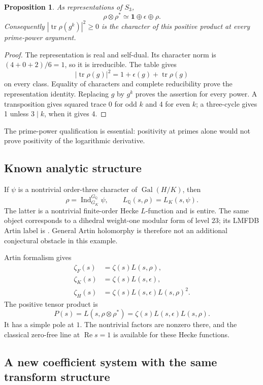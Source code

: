 \documentclass[11pt,letterpaper]{article}
\newtheorem{proposition}[theorem]{Proposition}
\theoremstyle{definition}
\theoremstyle{remark}
\newcommand{\Q}{\mathbb Q}
\newcommand{\Rea}{\operatorname{Re}}
\newcommand{\tr}{\operatorname{tr}}
\newcommand{\Gal}{\operatorname{Gal}}
\newcommand{\code}[1]{\texttt{\small\detokenize{#1}}}
\begin{document}
\begin{proposition}\label{prop:s3}
As representations of \(S_3\),
\[
 \rho\otimes\rho^*\simeq\mathbf1\oplus\epsilon\oplus\rho.
\]
Consequently \(|\tr\rho(g^k)|^2\ge0\) is the character of this
positive product at every prime-power argument.
\end{proposition}
\begin{proof}
The representation is real and self-dual. Its character norm is
\((4+0+2)/6=1\), so it is irreducible. The table gives
\[
 |\tr\rho(g)|^2=1+\epsilon(g)+\tr\rho(g)
\]
on every class. Equality of characters and complete reducibility
prove the representation identity. Replacing \(g\) by \(g^k\)
proves the assertion for every power. A transposition gives squared
trace 0 for odd \(k\) and 4 for even \(k\); a three-cycle gives 1
unless \(3\mid k\), when it gives 4.
\end{proof}

The prime-power qualification is essential: positivity at primes
alone would not prove positivity of the logarithmic derivative.

\subsection{Known analytic structure}

If \(\psi\) is a nontrivial order-three character of \(\Gal(H/K)\),
then
\[
 \rho=\operatorname{Ind}_{G_K}^{G_\Q}\psi,\qquad
 L_\Q(s,\rho)=L_K(s,\psi).
\]
The latter is a nontrivial finite-order Hecke \(L\)-function and is
entire. The same object corresponds to a dihedral weight-one
modular form of level \(23\); its LMFDB Artin label is
\code{2.23.3t2.b.a} \cite{khare,lmfdb}. General Artin holomorphy is
therefore not an additional conjectural obstacle in this example.

Artin formalism gives
\begin{align*}
 \zeta_F(s)&=\zeta(s)L(s,\rho),\\
 \zeta_K(s)&=\zeta(s)L(s,\epsilon),\\
 \zeta_H(s)&=\zeta(s)L(s,\epsilon)L(s,\rho)^2.
\end{align*}
The positive tensor product is
\[
 P(s)=L(s,\rho\otimes\rho^*)
     =\zeta(s)L(s,\epsilon)L(s,\rho).
\]
It has a simple pole at \(1\). The nontrivial factors are nonzero
there, and the classical zero-free line at \(\Rea s=1\) is available
for these Hecke functions.

\subsection{A new coefficient system with the same transform structure}
\end{document}
